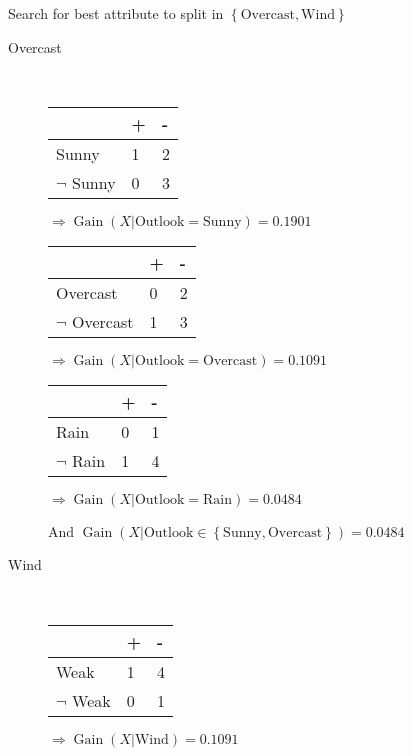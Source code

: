 \documentclass[10pt,a4paper,boxed]{hmcpset}
\DeclareMathOperator{\gain}{Gain}
\begin{document}
\begin{solution}
\begin{center}
			\end{center}

			Search for best attribute to split in $\left\{ \mathrm{Overcast},\mathrm{Wind} \right\}$	
			\begin{description}
				\item[Overcast] \hfill \\
				\begin{tabular}[H]{l|ll}
					& + & - \\ \hline
					Sunny				 & 1 & 2 \\
					$\neg$ Sunny & 0 & 3 \\
				\end{tabular}
				$\Rightarrow \gain(X|\mathrm{Outlook}=\mathrm{Sunny}) = 0.1901$

				\begin{tabular}[H]{l|ll}
					& + & - \\ \hline
					Overcast				 & 0 & 2 \\
					$\neg$ Overcast & 1 & 3 \\
				\end{tabular}
				$\Rightarrow \gain(X|\mathrm{Outlook}=\mathrm{Overcast}) = 0.1091$

				\begin{tabular}[H]{l|ll}
					& + & - \\ \hline
					Rain				 & 0 & 1 \\
					$\neg$ Rain & 1 & 4 \\
				\end{tabular}
				$\Rightarrow \gain(X|\mathrm{Outlook}=\mathrm{Rain}) = 0.0484$

				And $\gain(X|\mathrm{Outlook} \in \left\{ \mathrm{Sunny}, \mathrm{Overcast} \right\}) = 0.0484$

			\item[Wind] \hfill \\
				\begin{tabular}[H]{l|ll}
					& + & - \\ \hline
					Weak				 & 1 & 4 \\
					$\neg$ Weak & 0 & 1 \\
				\end{tabular}
				$\Rightarrow \gain(X|\mathrm{Wind}) = 0.1091$

		\end{description}


\end{solution}
\end{document}
